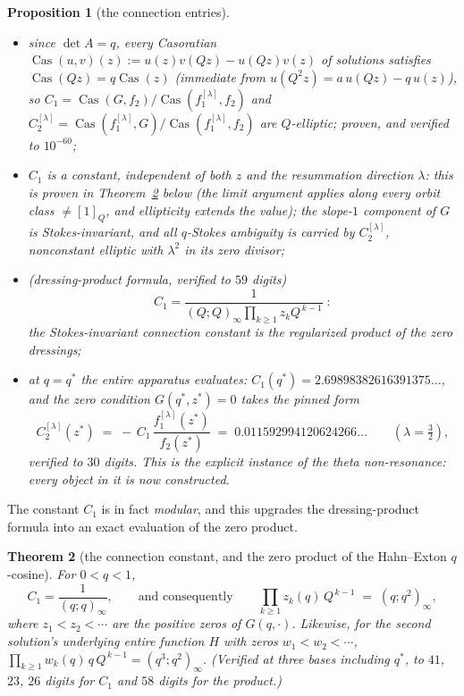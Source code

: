 \documentclass[11pt]{article}
\theoremstyle{plain}
\newtheorem{theorem}{Theorem}
\newtheorem{proposition}[theorem]{Proposition}
\theoremstyle{definition}
\theoremstyle{remark}
\begin{document}
\begin{proposition}[the connection entries]
\begin{itemize}
\item[\textup{(i)}] since $\det A=q$, every Casoratian
$\operatorname{Cas}(u,v)(z):=u(z)v(Qz)-u(Qz)v(z)$ of solutions satisfies
$\operatorname{Cas}(Qz)=q\operatorname{Cas}(z)$ (immediate from $u(Q^2z)=a\,u(Qz)-q\,u(z)$), so
$C_1=\operatorname{Cas}(G,f_2)/\operatorname{Cas}(f_1^{[\lambda]},f_2)$ and
$C_2^{[\lambda]}=\operatorname{Cas}(f_1^{[\lambda]},G)/\operatorname{Cas}(f_1^{[\lambda]},f_2)$ are
$Q$-elliptic; proven, and verified to $10^{-60}$;
\item[\textup{(ii)}] $C_1$ is a \emph{constant}, independent of both $z$ and the resummation direction
$\lambda$: this is proven in Theorem~\ref{thm:zeroproduct} below (the limit argument applies along
every orbit class $\ne[1]_Q$, and ellipticity extends the value); the slope-$1$ component of $G$ is
Stokes-invariant, and all $q$-Stokes ambiguity is carried by $C_2^{[\lambda]}$, nonconstant elliptic
with $\lambda^2$ in its zero divisor;
\item[\textup{(iii)}] \textup{(dressing-product formula, verified to $59$ digits)}
\[
   C_1=\frac1{(Q;Q)_\infty\prod_{k\ge1}z_kQ^{\,k-1}}\;:
\]
the Stokes-invariant connection constant is the regularized product of the zero dressings;
\item[\textup{(iv)}] at $q=q^\ast$ the entire apparatus evaluates: $C_1(q^\ast)=2.69898382616391375\ldots$,
and the zero condition $G(q^\ast,z^\ast)=0$ takes the pinned form
\[
   C_2^{[\lambda]}(z^\ast)\;=\;-\,C_1\,\frac{f_1^{[\lambda]}(z^\ast)}{f_2(z^\ast)}
   \;=\;0.011592994120624266\ldots\qquad(\lambda=\tfrac32),
\]
verified to $30$ digits. This is the explicit instance of the theta non-resonance: every object in it
is now constructed.
\end{itemize}
\end{proposition}

The constant $C_1$ is in fact \emph{modular}, and this upgrades the dressing-product formula into an
exact evaluation of the zero product.

\begin{theorem}[the connection constant, and the zero product of the Hahn--Exton $q$-cosine]
\label{thm:zeroproduct}
For $0<q<1$,
\[
   C_1=\frac1{(q;q)_\infty},
   \qquad\text{and consequently}\qquad
   \prod_{k\ge1} z_k(q)\,Q^{\,k-1}\;=\;(q;q^2)_\infty ,
\]
where $z_1<z_2<\cdots$ are the positive zeros of $G(q,\cdot)$. Likewise, for the second solution's
underlying entire function $H$ with zeros $w_1<w_2<\cdots$,
$\prod_{k\ge1}w_k(q)\,q\,Q^{\,k-1}=(q^3;q^2)_\infty$. \textup{(Verified at three bases including
$q^\ast$, to $41$, $23$, $26$ digits for $C_1$ and $58$ digits for the product.)}
\end{theorem}
\end{document}
